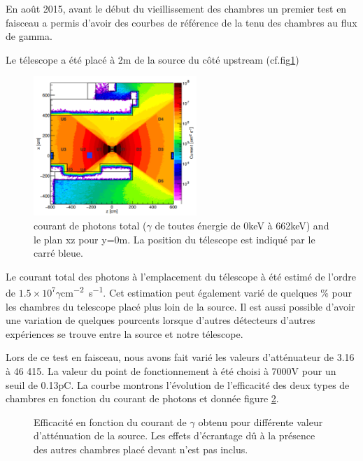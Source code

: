 En août 2015, avant le début du vieillissement des chambres un premier test en faisceau a permis d'avoir des courbes de référence de la tenu des chambres au flux de gamma.

Le télescope a été placé à 2m de la source du côté upstream (cf.fig\ref{PositionChambre})

\begin{figure}[!ht]
	\centering
	\includegraphics[width=0.55\textwidth]{GLA/PositionChamber.png}
	\caption{courant de photons total ($\gamma$ de toutes énergie de 0keV à 662keV) and le plan xz pour y=0m. La position du télescope est indiqué par le carré bleue.}
	\label{PositionChambre}
\end{figure}

Le courant total des photons à l'emplacement du télescope à été estimé de l'ordre de $1.5\times10^{7}\gamma$\si{cm^{-2}.s^{-1}}. Cet estimation peut également varié de quelques \% pour les chambres du telescope placé plus loin de la source. Il est aussi possible d'avoir une variation de quelques pourcents lorsque d'autres détecteurs d'autres expériences se trouve entre la source et notre télescope.

Lors de ce test en faisceau, nous avons fait varié les valeurs d'atténuateur de 3.16 à 46 415. La valeur du point de fonctionnement à été choisi à 7000V pour un seuil de 0.13pC. La courbe montrons l'évolution de l'efficacité des deux types de chambres en fonction du courant de photons et donnée figure \ref{ATTENUATEURGIF}.

\begin{figure}[!ht]
	\centering
	\scalebox{1.2}{}
	\caption{Efficacité en fonction du courant de $\gamma$ obtenu pour différente valeur d'atténuation de la source. Les effets d'écrantage dû à la présence des autres chambres placé devant n'est pas inclus.}
	\label{ATTENUATEURGIF}
\end{figure}

